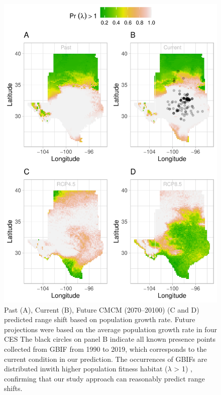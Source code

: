 \documentclass[12pt]{article}
\begin{document}
\begin{figure}[H]
  \begin{center}
    \includegraphics[width=0.78\linewidth]{Figures/Fig_geoPrlambdaprojection_fd_ces.pdf}
  \caption{Past (A), Current (B), Future CMCM (2070–20100) (C and D) predicted range shift based on population growth rate. Future projections were based on the average population growth rate in four CES The black circles on panel B indicate all known presence points collected from GBIF from 1990 to 2019, which corresponds to the current condition in our prediction.  The occurrences of GBIFs are distributed inwith higher population fitness habitat ($\lambda$ > 1) , confirming that our study approach can reasonably predict range shifts. }
  \label{Sup:geoprojcesfd}
  \end{center}
\end{figure}
\end{document}
